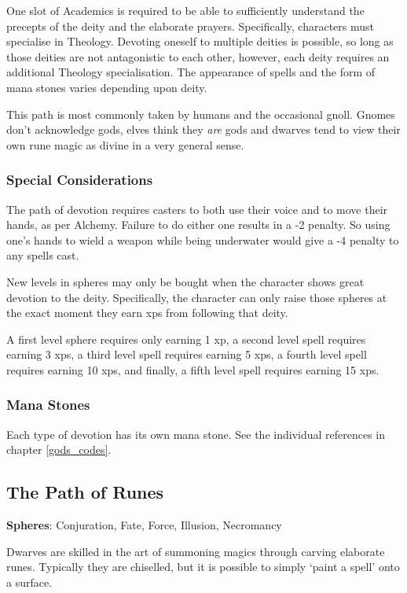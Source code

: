 \begin{multicols}{2}
One slot of Academics is required to be able to sufficiently understand the precepts of the deity and the elaborate prayers. Specifically, characters must specialise in Theology. Devoting oneself to multiple deities is possible, so long as those deities are not antagonistic to each other, however, each deity requires an additional Theology specialisation. The appearance of spells and the form of mana stones varies depending upon deity.

This path is most commonly taken by humans and the occasional gnoll. Gnomes don't acknowledge gods, elves think they \emph{are} gods and dwarves tend to view their own rune magic as divine in a very general sense.

\subsubsection{Special Considerations}

The path of devotion requires casters to both use their voice and to move their hands, as per Alchemy. Failure to do either one results in a -2 penalty. So using one's hands to wield a weapon while being underwater would give a -4 penalty to any spells cast.

New levels in spheres may only be bought when the character shows great devotion to the deity.
Specifically, the character can only raise those spheres at the exact moment they earn \glspl{xp} from following that deity.

A first level sphere requires only earning 1 \gls{xp}, a second level spell requires earning 3 \glspl{xp}, a third level spell requires earning 5 \glspl{xp}, a fourth level spell requires earning 10 \glspl{xp}, and finally, a fifth level spell requires earning 15 \glspl{xp}.

\subsubsection{Mana Stones}

Each type of devotion has its own mana stone.
See the individual references in chapter \ref{gods_codes}.

\subsection{The Path of Runes}

\textbf{Spheres}: Conjuration, Fate, Force, Illusion, Necromancy

\noindent Dwarves are skilled in the art of summoning magics through carving elaborate runes. Typically they are chiselled, but it is possible to simply `paint a spell' onto a surface.


\end{multicols}
